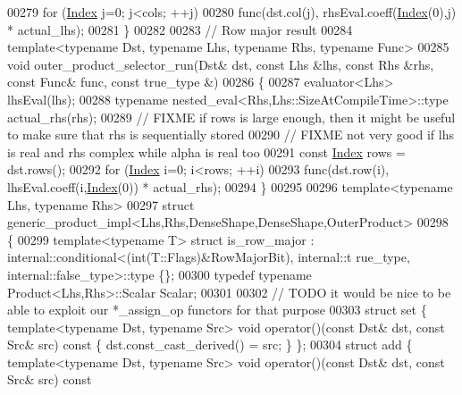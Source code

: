 \begin{DoxyCode}
00279   \textcolor{keywordflow}{for} (\hyperlink{namespace_eigen_a62e77e0933482dafde8fe197d9a2cfde}{Index} j=0; j<cols; ++j)
00280     func(dst.col(j), rhsEval.coeff(\hyperlink{namespace_eigen_a62e77e0933482dafde8fe197d9a2cfde}{Index}(0),j) * actual\_lhs);
00281 \}
00282 
00283 \textcolor{comment}{// Row major result}
00284 \textcolor{keyword}{template}<\textcolor{keyword}{typename} Dst, \textcolor{keyword}{typename} Lhs, \textcolor{keyword}{typename} Rhs, \textcolor{keyword}{typename} Func>
00285 \textcolor{keywordtype}{void} outer\_product\_selector\_run(Dst& dst, \textcolor{keyword}{const} Lhs &lhs, \textcolor{keyword}{const} Rhs &rhs, \textcolor{keyword}{const} Func& func, \textcolor{keyword}{const} true\_type
      &)
00286 \{
00287   evaluator<Lhs> lhsEval(lhs);
00288   \textcolor{keyword}{typename} nested\_eval<Rhs,Lhs::SizeAtCompileTime>::type actual\_rhs(rhs);
00289   \textcolor{comment}{// FIXME if rows is large enough, then it might be useful to make sure that rhs is sequentially stored}
00290   \textcolor{comment}{// FIXME not very good if lhs is real and rhs complex while alpha is real too}
00291   \textcolor{keyword}{const} \hyperlink{namespace_eigen_a62e77e0933482dafde8fe197d9a2cfde}{Index} rows = dst.rows();
00292   \textcolor{keywordflow}{for} (\hyperlink{namespace_eigen_a62e77e0933482dafde8fe197d9a2cfde}{Index} i=0; i<rows; ++i)
00293     func(dst.row(i), lhsEval.coeff(i,\hyperlink{namespace_eigen_a62e77e0933482dafde8fe197d9a2cfde}{Index}(0)) * actual\_rhs);
00294 \}
00295 
00296 \textcolor{keyword}{template}<\textcolor{keyword}{typename} Lhs, \textcolor{keyword}{typename} Rhs>
00297 \textcolor{keyword}{struct }generic\_product\_impl<Lhs,Rhs,DenseShape,DenseShape,OuterProduct>
00298 \{
00299   \textcolor{keyword}{template}<\textcolor{keyword}{typename} T> \textcolor{keyword}{struct }is\_row\_major : internal::conditional<(int(T::Flags)&RowMajorBit), internal::t
      rue\_type, internal::false\_type>::type \{\};
00300   \textcolor{keyword}{typedef} \textcolor{keyword}{typename} Product<Lhs,Rhs>::Scalar Scalar;
00301   
00302   \textcolor{comment}{// TODO it would be nice to be able to exploit our *\_assign\_op functors for that purpose}
00303   \textcolor{keyword}{struct }set  \{ \textcolor{keyword}{template}<\textcolor{keyword}{typename} Dst, \textcolor{keyword}{typename} Src> \textcolor{keywordtype}{void} operator()(\textcolor{keyword}{const} Dst& dst, \textcolor{keyword}{const} Src& src)\textcolor{keyword}{ const }
      \{ dst.const\_cast\_derived()  = src; \} \};
00304   \textcolor{keyword}{struct }add  \{ \textcolor{keyword}{template}<\textcolor{keyword}{typename} Dst, \textcolor{keyword}{typename} Src> \textcolor{keywordtype}{void} operator()(\textcolor{keyword}{const} Dst& dst, \textcolor{keyword}{const} Src& src)\textcolor{keyword}{ const }

\end{DoxyCode}
